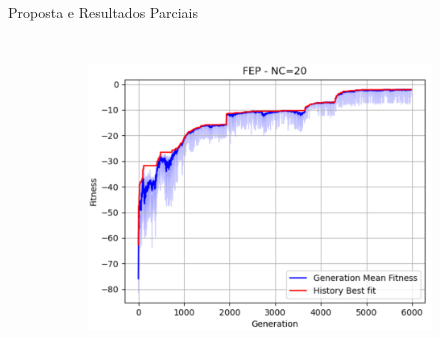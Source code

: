 \documentclass[pdf]{beamer}
\begin{document}
\begin{frame}{Proposta e Resultados Parciais}
\begin{columns}
\begin{figure}
\begin{subfigure}[t]{0.55\textwidth}
					\includegraphics[width=\linewidth]{img/FEP_NC20_exemplo.png}
				\end{subfigure}
			\end{figure}
		
	\end{columns}
\end{frame}
\end{document}
